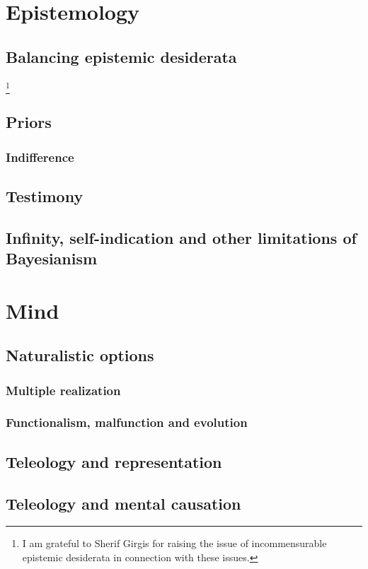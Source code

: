 \def\mychapter{V}

\chapter{Epistemology}\label{ch:epistemology}
\section{Balancing epistemic desiderata}
\footnote{I am grateful to Sherif Girgis for raising the issue of incommensurable epistemic desiderata in connection with these issues.}
\section{Priors}
\subsection{Indifference}
\section{Testimony}
\section{Infinity, self-indication and other limitations of Bayesianism}
\chaptertail 

\def\mychapter{VI}

\chapter{Mind}\label{ch:mind}
\section{Naturalistic options}
\subsection{Multiple realization}
\subsection{Functionalism, malfunction and evolution}
\section{Teleology and representation}
\section{Teleology and mental causation}
